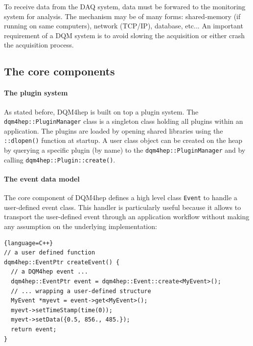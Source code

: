 \documentclass{webofc}
\begin{document}
To receive data from the DAQ system, data must be forwared to the monitoring system for analysis.
The mechanism may be of many forms: shared-memory (if running on same computers), network (TCP/IP), database, etc...
An important requirement of a DQM system is to avoid slowing the acquisition or either crash the acquisition process.

\subsection{The core components}
\label{subsec:core}

\paragraph{The plugin system}

As stated before, DQM4hep is built on top a plugin system. 
The \texttt{dqm4hep::PluginManager} class is a singleton class holding all plugins within an application. 
The plugins are loaded by opening shared libraries using the \texttt{::dlopen()} function at startup. 
A user class object can be created on the heap by querying a specific plugin (by name) to the \texttt{dqm4hep::PluginManager} and 
by calling \texttt{dqm4hep::Plugin::create()}.

\paragraph{The event data model}

The core component of DQM4hep defines a high level class \texttt{Event} to handle a user-defined event class.
This handler is particularly useful because it allows to transport the user-defined event through an application
workflow without making any assumption on the underlying implementation:

\begin{lstlisting}{language=C++}
// a user defined function
dqm4hep::EventPtr createEvent() {
  // a DQM4hep event ...
  dqm4hep::EventPtr event = dqm4hep::Event::create<MyEvent>();
  // ... wrapping a user-defined structure
  MyEvent *myevt = event->get<MyEvent>();
  myevt->setTimeStamp(time(0));
  myevt->setData({0.5, 856., 485.});
  return event;
}
\end{lstlisting}
\end{document}
